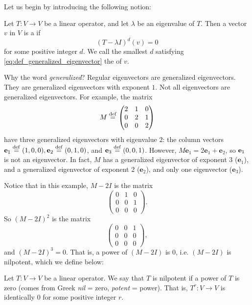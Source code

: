 Let us begin by introducing the following notion:

\begin{defn}\label{def:generalized_eigenvector}
Let $T: V \to V$ be a linear operator, and let $\lambda$ be an
eigenvalue of $T$. Then a vector $v$ in $V$ is a  if 
\begin{equation}\label{eq:def_generalized_eigenvector}
(T - \lambda I)^d(v) = 0
\end{equation}
for some positive integer $d$. We call the smallest $d$ satisfying
\eqref{eq:def_generalized_eigenvector} the  of $v$.
\end{defn}

Why the word \emph{generalized}? Regular eigenvectors are 
generalized eigenvectors. They are generalized eigenvectors with 
exponent $1$. Not all eigenvectors are generalized eigenvectors. 
For example, the matrix
\[
M \stackrel{\mathrm{def}}{=}
\left(
\begin{matrix}
2 & 1 & 0\\
0 & 2 & 1\\
0 & 0 & 2
\end{matrix}
\right)
\]
have three generalized eigenvectors with eigenvalue $2$: the column
vectors $\mathbf{e}_1 \stackrel{\mathrm{def}}{=} (1, 0, 0), \mathbf{e}_2 \stackrel{\mathrm{def}}{=} (0, 1, 0)$, 
and $\mathbf{e}_3 \stackrel{\mathrm{def}}{=} (0, 0, 1)$. However, $M\mathbf{e}_1 = 
2\mathbf{e}_1 + \mathbf{e}_2$, so $\textbf{e}_1$ is not an eigenvector. In fact, $M$ 
has a generalized eigenvector of exponent $3$ ($\mathbf{e}_1$),
and a generalized eigenvector of exponent $2$ ($\mathbf{e}_2$),
and only one eigenvector ($\mathbf{e}_3$).

Notice that in this example, $M - 2I$ is the matrix
\[
\left(
\begin{matrix}
0 & 1 & 0\\
0 & 0 & 1\\
0 & 0 & 0
\end{matrix}
\right).
\]
So $(M - 2I)^2$ is the matrix
\[
\left(
\begin{matrix}
0 & 0 & 1\\
0 & 0 & 0\\
0 & 0 & 0
\end{matrix}
\right),
\]
and $(M - 2I)^3 = 0$. That is, a power of $(M - 2I)$ is 0, i.e.
$(M - 2I)$ is nilpotent, which we define below:

\begin{defn}\label{def:nilpotent_operators}
Let $T: V \to V$ be a linear operator. We say that $T$ is nilpotent
if a power of $T$ is zero (comes from Greek \emph{nil} = zero, 
\emph{potent} = power). That is, $T^r : V \to V$ is identically 
$0$ for some positive integer $r$.
\end{defn}

